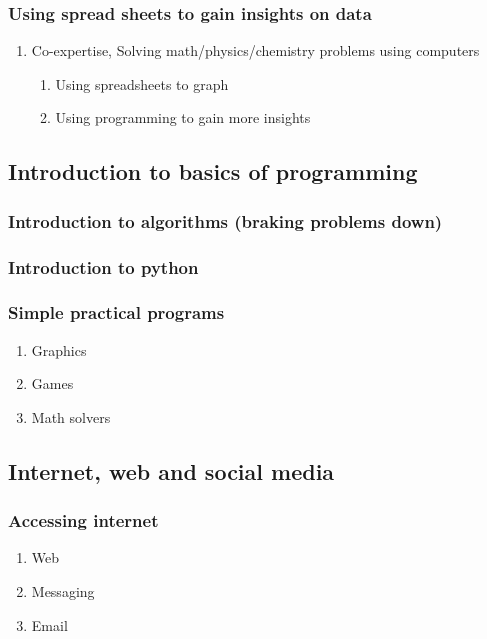 \documentclass[11pt]{article}
\begin{document}
\subsubsection{Using spread sheets to gain insights on data}
\label{sec:org18d09bb}
\begin{enumerate}
\item Co-expertise, Solving math/physics/chemistry problems using computers
\label{sec:org8570277}
\begin{enumerate}
\item Using spreadsheets to graph
\label{sec:org4921204}
\item Using programming to gain more insights
\label{sec:org7414bfe}
\end{enumerate}
\end{enumerate}
\subsection{Introduction to basics of programming}
\label{sec:org9bdd7fa}
\subsubsection{Introduction to algorithms (braking problems down)}
\label{sec:orge7ba09a}
\subsubsection{Introduction to python}
\label{sec:orga187f49}
\subsubsection{Simple practical programs}
\label{sec:orgea1a6f1}
\begin{enumerate}
\item Graphics
\label{sec:org43dfb35}
\item Games
\label{sec:org0bec4c4}
\item Math solvers
\label{sec:orgf2963ba}
\end{enumerate}
\subsection{Internet, web and social media}
\label{sec:orgbfe0448}
\subsubsection{Accessing internet}
\label{sec:orgc13de24}
\begin{enumerate}
\item Web
\label{sec:org8c813de}
\item Messaging
\label{sec:org6a2da1c}
\item Email
\label{sec:orgb071c7f}
\end{enumerate}
\end{document}
